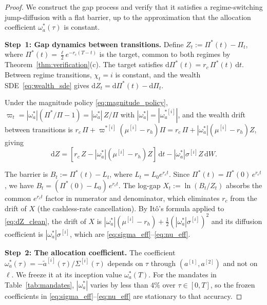 \documentclass[11pt,a4paper]{article}
\numberwithin{equation}{section}
\newcommand{\dd}{\mathrm{d}}
\begin{document}
\begin{appendices}
\begin{proof}
We construct the gap process and verify that it satisfies a regime-switching jump-diffusion with a flat barrier, up to the approximation that the allocation coefficient $\omega^*_a(\tau)$ is constant.

\medskip\noindent\textbf{Step~1: Gap dynamics between transitions.}
Define $Z_t := \Pi^{*}(t) - \Pi_t$, where $\Pi^{*}(t) = \tfrac{\ell}{2}e^{-r_c(T-t)}$ is the target, common to both regimes by Theorem~\ref{thm:verification}(c). The target satisfies $\dd\Pi^{*}(t) = r_c\,\Pi^{*}(t)\,\dd t$. Between regime transitions, $\chi_t = i$ is constant, and the wealth SDE~\eqref{eq:wealth_sde} gives $\dd Z_t = \dd \Pi^{*}(t) - \dd \Pi_t$.

Under the magnitude policy \eqref{eq:magnitude_policy}, $\varpi_t = |\omega^*_a|(\Pi^{*}/\Pi - 1) = |\omega^*_a|\,Z/\Pi$ with $|\omega^*_a| = |\omega^{*[i]}_a|$, and the wealth drift between transitions is $r_c\,\Pi + \varpi^{*[i]}(\mu^{[i]} - r_h)\Pi = r_c\,\Pi + |\omega^*_a|(\mu^{[i]} - r_h)Z$, giving
\begin{equation}\label{eq:dZ_clean}
\dd Z = [r_c\,Z - |\omega^*_a|(\mu^{[i]} - r_h)Z]\,\dd t - |\omega^*_a|\sigma^{[i]}Z\,\dd W.
\end{equation}

The barrier is $B_t := \Pi^{*}(t) - L_t$, where $L_t = L_0 e^{r_c t}$.  Since $\Pi^{*}(t) = \Pi^{*}(0)\,e^{r_c t}$, we have $B_t = (\Pi^{*}(0) - L_0)\,e^{r_c t}$.  The log-gap $X_t := \ln(B_t/Z_t)$ absorbs the common $e^{r_c t}$ factor in numerator and denominator, which eliminates $r_c$ from the drift of $X$ (the cashless-rate cancellation).  By It\^o's formula applied to \eqref{eq:dZ_clean}, the drift of $X$ is $|\omega^*_a|(\mu^{[i]} - r_h) + \tfrac{1}{2}(|\omega^*_a|\sigma^{[i]})^2$ and its diffusion coefficient is $|\omega^*_a|\sigma^{[i]}$, which are \eqref{eq:sigma_eff}--\eqref{eq:nu_eff}.

\medskip\noindent\textbf{Step~2: The allocation coefficient.}
The coefficient $\omega^*_a(\tau) = -\tilde{a}^{[i]}(\tau)/\Sigma^{[i]}(\tau)$ depends on $\tau$ through $(a^{[1]}, a^{[2]})$ and not on $\ell$.  We freeze it at its inception value $\omega^*_a(T)$.  For the mandates in Table~\ref{tab:mandates}, $|\omega^*_a|$ varies by less than $4\%$ over $\tau \in [0, T]$, so the frozen coefficients in \eqref{eq:sigma_eff}--\eqref{eq:nu_eff} are stationary to that accuracy.


\end{proof}
\end{appendices}
\end{document}
